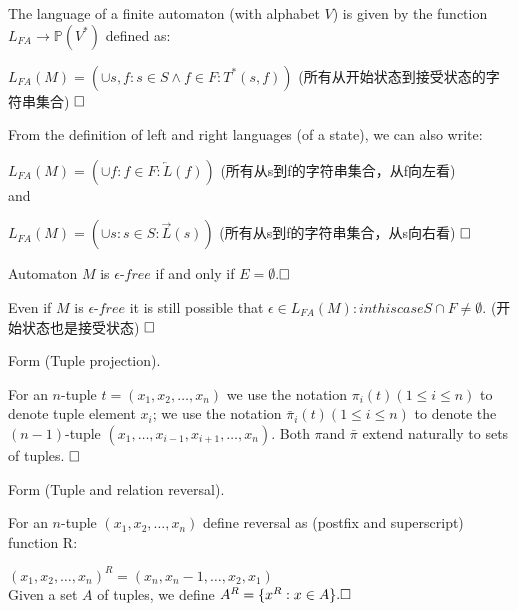 \begin{definition}[Language of an $FA$]
	The language of a finite automaton (with alphabet $V$) is given by the function $L_{FA}\to \mathbb{P}(V^\ast)$ defined as:
	
	$L_{FA}(M)=(\cup s,f:s\in S\land f\in F:T^\ast(s,f))$ (所有从开始状态到接受状态的字符串集合)
	$\hfill\square$
\end{definition}

\begin{property}[Language of an $FA$]
	From the definition of left and right languages (of a state), we can also write:
	
	$L_{FA}(M) = (\cup f:f\in F:\overleftarrow{L}(f))$ (所有从s到f的字符串集合，从f向左看)\\
	and
	
	$L_{FA}(M) = (\cup s:s\in S:\overrightarrow{L}(s))$ (所有从s到f的字符串集合，从s向右看) 
	$\hfill\square$
\end{property}

\begin{definition}
	Automaton $M$ is $\epsilon$-$free$ if and only if $E=\emptyset$.$\hfill\square$
\end{definition}

\begin{remark}
	Even if $M$ is $\epsilon$-$free$ it is still possible that $\epsilon\in L_{FA}(M): in this case S\cap F \ne \emptyset$. (开始状态也是接受状态) $\hfill\square$
\end{remark}


Form \cite[Convention A.4]{WATSON93a} (Tuple projection).

\begin{convention}\label{con:project}
	For an $n$-tuple $t=(x_1,x_2,\dots,x_n)$ we use the notation
	$\pi_i(t) (1\le i\le n)$ to denote tuple element $x_i$; we use the notation $\bar{\pi}_i(t) (1\le i\le n)$ to denote the $(n-1)$-tuple $(x_1,\dots,x_{i-1},x_{i+1},\dots,x_n)$. Both $\pi$and $\bar{\pi}$ extend naturally to sets of tuples. $\hfill\square$
\end{convention}

Form \cite[Definition A.20]{WATSON93a} (Tuple and relation reversal).

\begin{definition} \label{def:reversal}
	For an $n$-tuple $(x_1,x_2,\dots,x_n)$ define reversal as (postfix and superscript) function R:
	
	$(x_1,x_2,\dots,x_n)^R = (x_n,x_n-1,\dots,x_2,x_1)$ \\ 
	Given a set $A$ of tuples, we define $A^R=\{x^R:x\in A\}. \hfill\square$
\end{definition}

